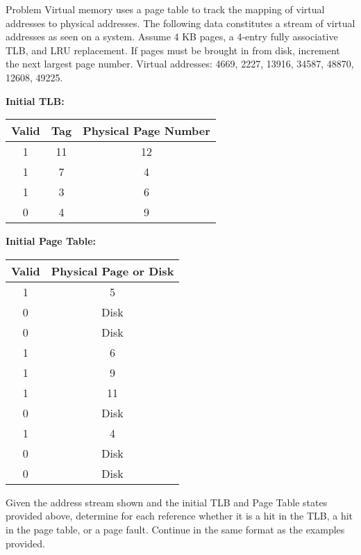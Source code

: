 \begin{problem}{}{Problem}
	Virtual memory uses a page table to track the mapping of virtual addresses to physical addresses. The following data constitutes a stream of virtual addresses as seen on a system. Assume 4 KB pages, a 4-entry fully associative TLB, and LRU replacement. If pages must be brought in from disk, increment the next largest page number. Virtual addresses: 4669, 2227, 13916, 34587, 48870, 12608, 49225.
	
	\bigskip
	
	\textbf{Initial TLB:}
	
	\begin{center}
		\begin{tabular}{|c|c|c|}
			\hline
			\textbf{Valid} & \textbf{Tag} & \textbf{Physical Page Number} \\
			\hline
			1 & 11 & 12 \\
			\hline
			1 & 7 & 4 \\
			\hline
			1 & 3 & 6 \\
			\hline
			0 & 4 & 9 \\
			\hline
		\end{tabular}
	\end{center}
	
	\bigskip
	
	\textbf{Initial Page Table:}
	
	\begin{center}
		\begin{tabular}{|c|c|}
			\hline
			\textbf{Valid} & \textbf{Physical Page or Disk} \\
			\hline
			1 & 5 \\
			\hline
			0 & Disk \\
			\hline
			0 & Disk \\
			\hline
			1 & 6 \\
			\hline
			1 & 9 \\
			\hline
			1 & 11 \\
			\hline
			0 & Disk \\
			\hline
			1 & 4 \\
			\hline
			0 & Disk \\
			\hline
			0 & Disk \\
			\hline
		\end{tabular}
	\end{center}
	
	Given the address stream shown and the initial TLB and Page Table states provided above, determine for each reference whether it is a hit in the TLB, a hit in the page table, or a page fault. Continue in the same format as the examples provided.
	

\end{problem}
